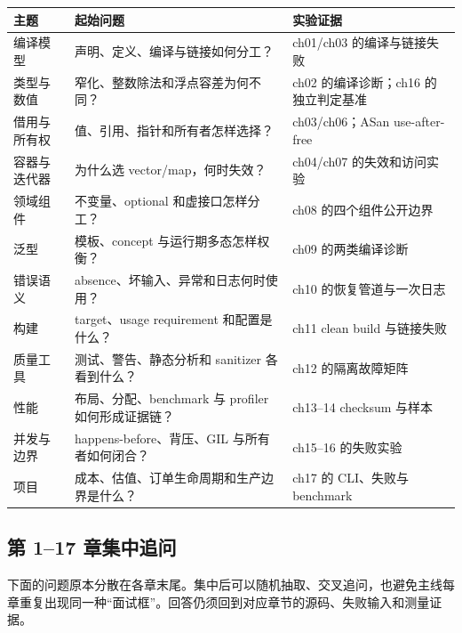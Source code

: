 \begin{center}
\begin{tabularx}{\textwidth}{@{}p{}p{}X@{}}
\toprule
主题 & 起始问题 & 实验证据 \\
\midrule
编译模型 & 声明、定义、编译与链接如何分工？ & ch01/ch03 的编译与链接失败 \\
类型与数值 & 窄化、整数除法和浮点容差为何不同？ & ch02 的编译诊断；ch16 的独立判定基准\\
借用与所有权 & 值、引用、指针和所有者怎样选择？ & ch03/ch06；ASan use-after-free \\
容器与迭代器 & 为什么选 vector/map，何时失效？ & ch04/ch07 的失效和访问实验 \\
领域组件 & 不变量、optional 和虚接口怎样分工？ & ch08 的四个组件公开边界\\
泛型 & 模板、concept 与运行期多态怎样权衡？ & ch09 的两类编译诊断 \\
错误语义 & absence、坏输入、异常和日志何时使用？ & ch10 的恢复管道与一次日志 \\
构建 & target、usage requirement 和配置是什么？ & ch11 clean build 与链接失败 \\
质量工具 & 测试、警告、静态分析和 sanitizer 各看到什么？ & ch12 的隔离故障矩阵 \\
性能 & 布局、分配、benchmark 与 profiler 如何形成证据链？ & ch13--14 checksum 与样本 \\
并发与边界 & happens-before、背压、GIL 与所有者如何闭合？ & ch15--16 的失败实验 \\
项目 & 成本、估值、订单生命周期和生产边界是什么？ & ch17 的 CLI、失败与 benchmark \\
\bottomrule
\end{tabularx}
\end{center}

\subsection{第 1--17 章集中追问}

下面的问题原本分散在各章末尾。集中后可以随机抽取、交叉追问，也避免主线每章重复出现同一种“面试框”。回答仍须回到对应章节的源码、失败输入和测量证据。

